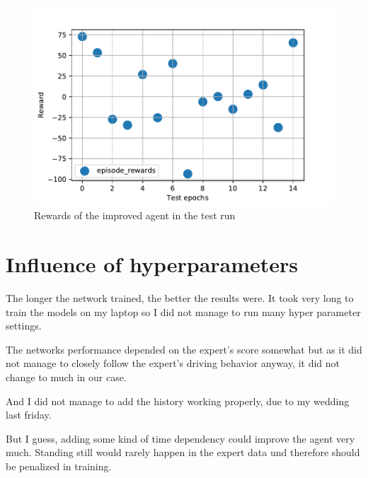 \documentclass[
        a4paper,
        10pt,
        parskip = full,    %
    ]{scrartcl}
\begin{document}
\begin{figure}[H]
  \begin{center}
    \includegraphics[width=16cm]{../images/Reward_of_Agent.pdf}
    \caption{Rewards of the improved agent in the test run}
    \label{Learning measurements}
  \end{center}
\end{figure}

\section{Influence of hyperparameters}
The longer the network trained, the better the results were. It took very long
to train the models on my laptop so I did not manage to run many hyper parameter
settings.

The networks performance depended on the expert's score somewhat but as it did
not manage to closely follow the expert's driving behavior anyway, it did not
change to much in our case.

And I did not manage to add the history working properly, due to my wedding last
friday.

But I guess, adding some kind of time dependency could improve the agent very much.
Standing still would rarely happen in the expert data und therefore should be penalized
in training.
\end{document}
